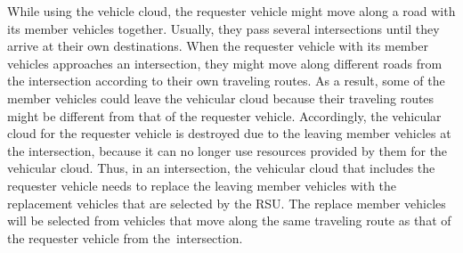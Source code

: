 \documentclass[electronics,aricle,accept,pdftex,moreauthors]{Definitions/mdpi}
\begin{document}
While using the vehicle cloud, the requester vehicle might move along a road with its member vehicles together.
Usually, they pass several intersections until they arrive at their own destinations.
When the requester vehicle with its member vehicles approaches an intersection, they might move along different roads from the intersection according to their own traveling routes. 
As a result, some of the member vehicles could leave the vehicular cloud because their traveling routes might be
different from that of the requester vehicle. 
Accordingly, the vehicular cloud for the requester vehicle is destroyed due to the leaving member vehicles at the intersection, because it can no longer use resources provided by them for the vehicular cloud.
Thus, in an intersection, the vehicular cloud that includes the requester vehicle needs to replace the leaving member vehicles with the replacement vehicles that are selected by the RSU.
The replace member vehicles will be selected from vehicles that move along the same traveling route as that of the requester vehicle from the~intersection.
\end{document}

